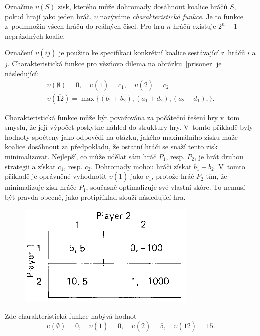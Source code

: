 \documentclass[12pt,a5paper]{article}
\begin{document}

Označme $\upsilon(S)$ zisk, kterého může dohromady dosáhnout koalice hráčů $S$, pokud hrají jako jeden hráč. $\upsilon$ nazýváme \emph{charakteristická funkce}. Je to funkce z~podmnožin všech hráčů do reálných čísel. Pro hru $n$ hráčů existuje $2^n-1$ neprázdných koalic.

Označení $\upsilon(\overline{ij})$ je použito ke specifikaci konkrétní koalice sestávající z~hráčů $i$ a $j$. Charakteristická funkce pro vězňovo dilema na obrázku~\ref{prisoner} je následující:
\begin{gather*}
\upsilon(\emptyset)=0, \quad \upsilon(\overline{1})=c_1, \quad \upsilon(\overline{2})=c_2\\
\upsilon(\overline{12})=\max \{ (b_1+b_2),(a_1+d_2),(a_2+d_1), \}.
\end{gather*}

Charakteristická funkce může být považována za počáteční řešení hry v~tom smyslu, že její výpočet poskytne náhled do struktury hry. V~tomto příkladě byly hodnoty spočteny jako odpovědi na otázku, jakého maximálního zisku může koalice dosáhnout za předpokladu, že ostatní hráči se snaží tento zisk minimalizovat. Nejlepší, co může udělat sám hráč $P_1$, resp. $P_2$, je hrát druhou strategii a získat $c_1$, resp. $c_2$. Dohromady mohou hráči získat $b_1+b_2$. V~tomto příkladě je oprávněné vyhodnotit $\upsilon(\overline{1})$ jako $c_1$, protože hráč $P_2$ tím, že minimalizuje zisk hráče $P_1$, současně optimalizuje své vlastní skóre. To nemusí být pravda obecně, jako protipříklad slouží následující hra.

\begin{figure}[htb]
\centering
\includegraphics[scale=0.35]{1_5.png}
\caption{}
\end{figure}
 
 Zde charakteristická funkce nabývá hodnot
\[
\upsilon(\emptyset)=0, \quad \upsilon(\overline{1})=0, \quad \upsilon(\overline{2})=5, \quad
\upsilon(\overline{12})=15.
\]
\end{document}
